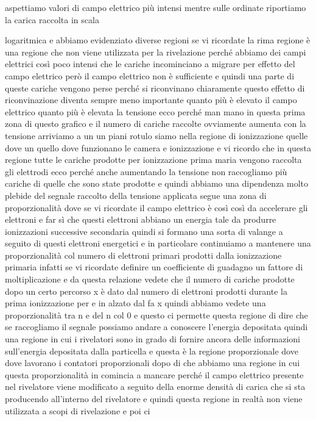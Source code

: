 aspettiamo valori di campo elettrico più intensi mentre sulle ordinate riportiamo la carica raccolta in scala 

logaritmica e abbiamo evidenziato diverse regioni se vi ricordate la rima regione è una regione che non viene utilizzata per la rivelazione perché abbiamo dei campi elettrici così poco intensi che le cariche incominciano a migrare per effetto del campo elettrico però il campo elettrico non è sufficiente e quindi una parte di queste cariche vengono perse perché si riconvinano chiaramente questo effetto di riconvinazione diventa sempre meno importante quanto più è elevato il campo elettrico quanto più è elevata la tensione ecco perché man mano in questa prima zona di questo grafico e il numero di cariche raccolte ovviamente aumenta con la tensione arriviamo a un un piani rotulo siamo nella regione di ionizzazione quelle dove un quello dove funzionano le camera e ionizzazione e vi ricordo che in questa regione tutte le cariche prodotte per ionizzazione prima maria vengono raccolta gli elettrodi ecco perché anche aumentando la tensione non raccogliamo più cariche di quelle che sono state prodotte e quindi abbiamo una dipendenza molto plebide del segnale raccolto della tensione applicata segue una zona di proporzionalità dove se vi ricordate il campo elettrico è così così da accelerare gli elettroni e far sì che questi elettroni abbiano un energia tale da produrre ionizzazioni successive secondaria quindi si formano una sorta di valange a seguito di questi elettroni energetici e in particolare continuiamo a mantenere una proporzionalità col numero di elettroni primari prodotti dalla ionizzazione primaria infatti se vi ricordate definire un coefficiente di guadagno un fattore di moltiplicazione e da questa relazione vedete che il numero di cariche prodotte dopo un certo percorso x è dato dal numero di elettroni prodotti durante la prima ionizzazione per e in alzato dal fa x quindi abbiamo vedete una proporzionalità tra n e del n col 0 e questo ci permette questa regione di dire che se raccogliamo il segnale possiamo andare a conoscere l'energia depositata quindi una regione in cui i rivelatori sono in grado di fornire ancora delle informazioni sull'energia depositata dalla particella e questa è la regione proporzionale dove dove lavorano i contatori proporzionali dopo di che abbiamo una regione in cui questa proporzionalità in comincia a mancare perché il campo elettrico presente nel rivelatore viene modificato a seguito della enorme densità di carica che si sta producendo all'interno del rivelatore e quindi questa regione in realtà non viene utilizzata a scopi di rivelazione e poi ci 

